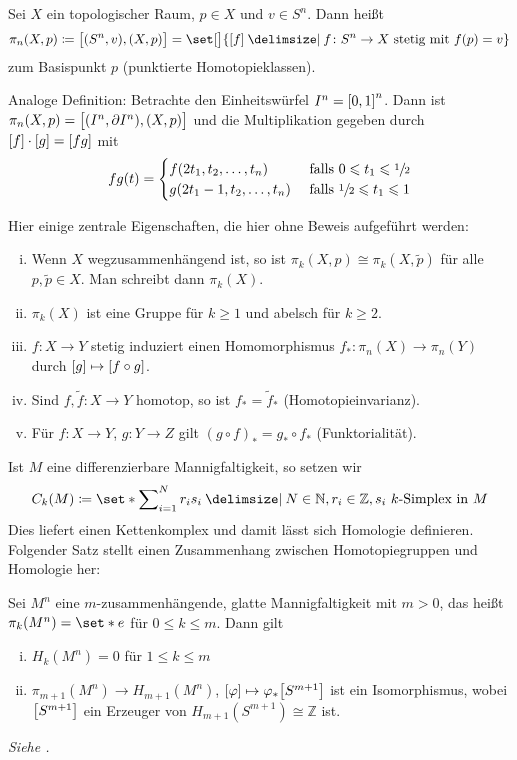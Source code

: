 \begin{definition}[{name=[Homotopiegruppen]}]
	Sei $X$ ein topologischer Raum, $p \in X$ und $v \in S^n$.
	Dann heißt 
	\[
		\pi_n(X,p) \coloneqq \benbrace[\big]{(S^n,v) , (X,p)} = \set[\big]{\benbrace*{f} \given f \colon S^n \to X \text{ stetig  mit } f(p)=v }
	\]
	 zum Basispunkt $p$ (punktierte Homotopieklassen).
	
	Analoge Definition: Betrachte den Einheitswürfel $I^n = \benbrace*{0,1}^n$. Dann ist $\pi_n(X,p) = \benbrace[\big]{(I^n,\partial I^n), (X,p)}$ und die Multiplikation gegeben durch $\benbrace*{f} \cdot \benbrace*{g} = \benbrace*{f g}$ mit
	\[
		f g (t ) = \begin{cases}
			f(2t_1, t_2, \ldots ,t_n) &\text{ falls }0 \le t_1 \le \sfrac{1}{2}\\
			g(2t_1 -1, t_2, \ldots , t_n) &\text{ falls } \sfrac{1}{2} \le t_1 \le 1
		\end{cases}
	\]
\end{definition}

Hier einige zentrale Eigenschaften, die hier ohne Beweis aufgeführt werden:
\begin{enumerate}[(i),itemsep=1pt]
	\item Wenn $X$ wegzusammenhängend ist, so ist $\pi_k(X,p) \cong \pi_k(X,\tilde{p})$ für alle $p, \tilde{p} \in X$. 
	Man schreibt dann $\pi_k(X)$.
	\item $\pi_k(X)$ ist eine Gruppe für $k \ge 1$ und abelsch für $k \ge 2$.
	\item $f \colon X \to Y$ stetig induziert einen Homomorphismus $f_* \colon \pi_n(X) \to \pi_n(Y)$ durch $\benbrace*{g} \mapsto \benbrace*{f \circ g}$.
	\item Sind $f, \tilde{f} \colon X \to Y$ homotop, so ist $f_* = \tilde{f}_*$ (Homotopieinvarianz).
	\item Für $f \colon X \to Y$, $g \colon Y \to Z$ gilt $(g \circ f)_* = g_* \circ f_*$ (Funktorialität).
\end{enumerate}

Ist $M$ eine differenzierbare Mannigfaltigkeit, so setzen wir 
\[
	C_k(M) \coloneqq \set*{\sum\nolimits_{i=1}^N r_i s_i \given N \in \mathbb{N}, r_i \in \mathbb{Z}, s_i \text{ $k$-Simplex in }M  }
\]
Dies liefert einen Kettenkomplex und damit lässt sich Homologie definieren.
Folgender Satz stellt einen Zusammenhang zwischen Homotopiegruppen und Homologie her:
\begin{satz}[name={Hurewicz}]
	Sei $M^n$ eine $m$-zusammenhängende, glatte Mannigfaltigkeit mit $m>0$, das heißt $\pi_k(M^n)= \set*{e}$ für $0 \le k \le m$.
	Dann gilt
	\begin{enumerate}[(i)]
		\item $H_k(M^n) =0$ für $1 \le k \le m$
		\item $\pi_{m+1}(M^n) \to H_{m+1}(M^n)$, $\benbrace*{\varphi} \mapsto \varphi_* \benbrace*{S^{m+1}}$ ist ein Isomorphismus, wobei $\benbrace*{S^{m+1}}$ ein Erzeuger von $H_{m+1}(S^{m+1}) \cong \mathbb{Z}$ ist.
	\end{enumerate}
\end{satz}
\begin{beweis}
	\emph{Siehe \textcite[Thm.~4.32]{Hatcher}.}
\end{beweis}

